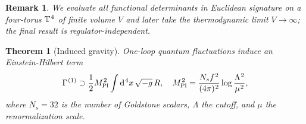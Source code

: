 \documentclass[pdflatex,sn-mathphys-num]{sn-jnl}
\theoremstyle{thmstyleone}
\newtheorem{theorem}{Theorem}
\theoremstyle{thmstyletwo}%
\newtheorem{remark}{Remark}%
\theoremstyle{thmstylethree}%
\newcommand{\sm}{\hspace{.065em}}
\newcommand{\smexp}[1]{^{\sm #1}}
\newcommand{\Hess}[1]{\operatorname{Hess}}
\newcommand{\dv}[1]{\mathrm{d}\smexp{#1}}
\begin{document}


\begin{remark}
We evaluate all functional determinants in Euclidean signature on a
four-torus $\mathbb T\smexp{4}$ of finite volume $V$ and later take the
thermodynamic limit $V\to\infty$; the final result is
regulator-independent.
\end{remark}

\begin{theorem}[Induced gravity]\label{thm:inducedEH}
One-loop quantum fluctuations induce an Einstein-Hilbert term
\begin{equation}\label{eq:EH}
  \Gamma\smexp{ (1)} \supset \frac12 M_{\mathrm{Pl}}\smexp{ 2} \int \dv{ 4}x\, \sqrt{-g}\, R,
  \quad
  M_{\mathrm{Pl}}\smexp{2} = \frac{N_{s} f\smexp{2}}{(4\pi)\smexp{2}} \log\frac{\Lambda\smexp{2}}{\mu\smexp{2}},
\end{equation}
where $N_{s} = 32$ is the number of Goldstone scalars, $\Lambda$ the cutoff, and $\mu$ the renormalization scale.
\end{theorem}
\end{document}
